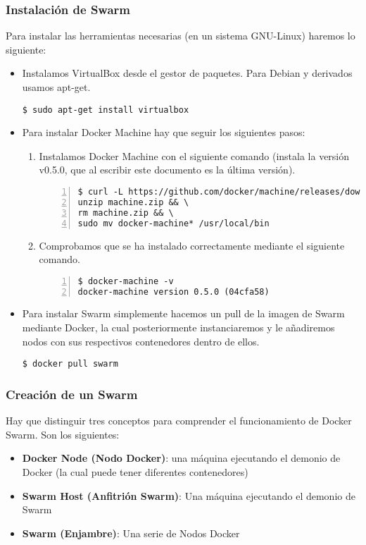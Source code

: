 			\subsubsection{Instalación de Swarm}
			Para instalar las herramientas necesarias (en un sistema GNU-Linux) haremos lo siguiente:
			\begin{itemize}
				\item Instalamos VirtualBox desde el gestor de paquetes. Para Debian y derivados usamos apt-get.
				\begin{lstlisting}[style=consola]
$ sudo apt-get install virtualbox
				\end{lstlisting}
				\item Para instalar Docker Machine hay que seguir los siguientes pasos: \cite{docker-machine-install}
				\begin{enumerate}
					\item Instalamos Docker Machine con el siguiente comando (instala la versión  v0.5.0, que al escribir este documento es la última versión).
					\begin{lstlisting}[style=consola,numbers=left]
$ curl -L https://github.com/docker/machine/releases/download/v0.5.0/docker-machine_linux-amd64.zip >machine.zip && \
unzip machine.zip && \
rm machine.zip && \
sudo mv docker-machine* /usr/local/bin
					\end{lstlisting}
					\item Comprobamos que se ha instalado correctamente mediante el siguiente comando.
					\begin{lstlisting}[style=consola,numbers=left]
$ docker-machine -v
docker-machine version 0.5.0 (04cfa58)
					\end{lstlisting}
				\end{enumerate}
				\item Para instalar Swarm simplemente hacemos un pull de la imagen de Swarm mediante Docker, la cual posteriormente instanciaremos y le añadiremos nodos con sus respectivos contenedores dentro de ellos.
				\begin{lstlisting}[style=consola]
$ docker pull swarm
				\end{lstlisting}
			\end{itemize}
		
			\subsubsection{Creación de un Swarm}
			Hay que distinguir tres conceptos para comprender el funcionamiento de Docker Swarm. Son los siguientes:
			\begin{itemize}
				\item \textbf{Docker Node (Nodo Docker)}: una máquina ejecutando el demonio de Docker (la cual puede tener diferentes contenedores)
				\item \textbf{Swarm Host (Anfitrión Swarm)}: Una máquina ejecutando el demonio de Swarm
				\item \textbf{Swarm (Enjambre)}: Una serie de Nodos Docker
			\end{itemize}
			
